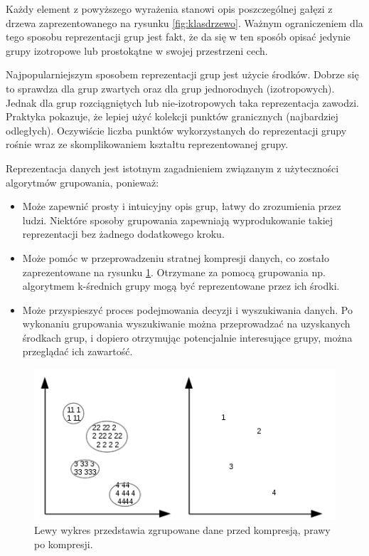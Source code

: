 \documentclass{article}
\begin{document}
Każdy element z powyższego wyrażenia stanowi opis poszczególnej gałęzi z drzewa zaprezentowanego na rysunku \ref{fig:klasdrzewo}. Ważnym ograniczeniem dla tego sposobu reprezentacji grup jest fakt, że da się w ten sposób opisać jedynie grupy izotropowe lub prostokątne w swojej przestrzeni cech.

Najpopularniejszym sposobem reprezentacji grup jest użycie środków. Dobrze się to sprawdza dla grup zwartych oraz dla grup jednorodnych (izotropowych). Jednak dla grup rozciągniętych lub nie-izotropowych taka reprezentacja zawodzi. Praktyka pokazuje, że lepiej użyć kolekcji punktów granicznych (najbardziej odległych). Oczywiście liczba punktów wykorzystanych do reprezentacji grupy rośnie wraz ze skomplikowaniem kształtu reprezentowanej grupy.

Reprezentacja danych jest istotnym zagadnieniem związanym z użyteczności algorytmów grupowania, ponieważ:

\begin{itemize}
	\item Może zapewnić prosty i intuicyjny opis grup, łatwy do zrozumienia przez ludzi. Niektóre sposoby grupowania zapewniają wyprodukowanie takiej reprezentacji bez żadnego dodatkowego kroku.
	\item Może pomóc w przeprowadzeniu stratnej kompresji danych, co zostało zaprezentowane na rysunku \ref{fig:kompresjagrup}. Otrzymane za pomocą grupowania np. algorytmem k-średnich grupy mogą być reprezentowane przez ich środki.
	\item {Może przyspieszyć proces podejmowania decyzji i wyszukiwania danych. Po wykonaniu grupowania wyszukiwanie można przeprowadzać na uzyskanych środkach grup, i dopiero otrzymując potencjalnie interesujące grupy, można przeglądać ich zawartość.}
\end{itemize}

\begin{figure}
	\centering
	\includegraphics[scale=1.1]{kompresjagrup.png}
	\caption{Lewy wykres przedstawia zgrupowane dane przed kompresją, prawy po kompresji.}
	\label{fig:kompresjagrup}
\end{figure}
\end{document}
